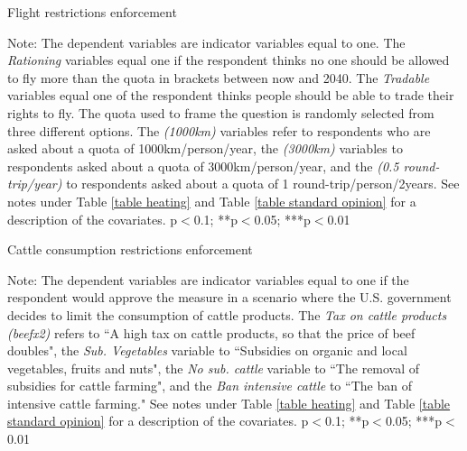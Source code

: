\documentclass{article}
\begin{document}
\begin{landscape}
	\begin{table}[h!]
	\caption{Flight restrictions enforcement}
	\begin{center}
		\scalebox{0.6}{}
	\end{center}
	{\footnotesize Note: The dependent variables are indicator variables equal to one. The \textit{Rationing} variables equal one if the respondent thinks no one should be allowed to fly more than the quota in brackets between now and 2040. The \textit{Tradable} variables equal one of the respondent thinks people should be able to trade their rights to fly. The quota used to frame the question is randomly selected from three different options. The \textit{(1000km)} variables refer to respondents who are asked about a quota of 1000km/person/year, the \textit{(3000km)} variables to respondents asked about a quota of 3000km/person/year, and the \textit{(0.5 round-trip/year)} to respondents asked about a quota of 1 round-trip/person/2years.  See notes under Table \ref{table heating} and Table \ref{table standard opinion} for a description of the covariates.
	\newline *p$<$0.1; **p$<$0.05; ***p$<$0.01}
\end{table}	
\end{landscape}

\begin{table}[h!]
	\caption{Cattle consumption restrictions enforcement}
	\begin{center}
		\scalebox{0.7}{}
	\end{center}
	{\footnotesize Note: The dependent variables are indicator variables equal to one if the respondent would approve the measure in a scenario where the U.S. government decides to limit the consumption of cattle products. The \textit{Tax on cattle products (beefx2)} refers to ``A high tax on cattle products, so that the price of beef doubles", the \textit{Sub. Vegetables} variable to ``Subsidies on organic and local vegetables, fruits and nuts", the \textit{No sub. cattle} variable to ``The removal of subsidies for cattle farming", and the \textit{Ban intensive cattle} to ``The ban of intensive cattle farming." See notes under Table \ref{table heating} and Table \ref{table standard opinion} for a description of the covariates.
	\newline *p$<$0.1; **p$<$0.05; ***p$<$0.01}
\end{table}	
\end{document}
